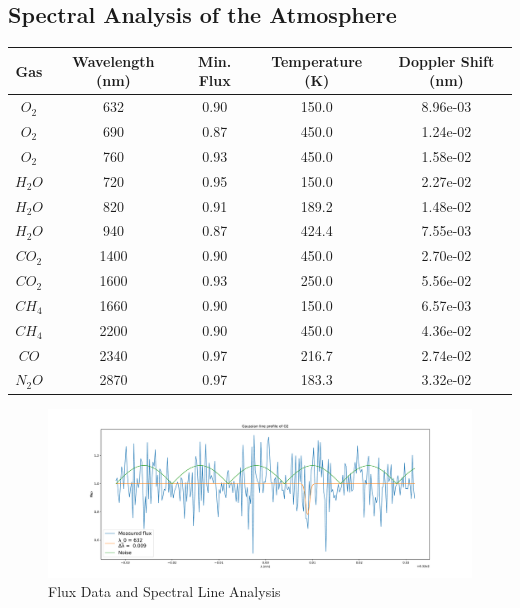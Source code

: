 \documentclass[reprint,english,notitlepage]{revtex4-2}
\begin{document}
\subsection{Spectral Analysis of the Atmosphere} \label{ssec: Analysis results}
\begin{table}[h!] \label{tab: Spec anal}
  \begin{tabular}{|c|*{4}{c|}}    
    \hline
    Gas  &Wavelength (nm) &Min. Flux &Temperature (K) &Doppler Shift (nm) \\
    \hline
    $ O_{2} $ &632 &0.90 &150.0 &8.96e-03 \\
    \hline
    $ O_{2} $ &690 &0.87 &450.0 &1.24e-02 \\
    \hline
    $ O_{2} $ &760 &0.93 &450.0 &1.58e-02 \\
    \hline
    $ H_{2}O $ &720 &0.95 &150.0 &2.27e-02 \\
    \hline
    $ H_{2}O $ &820 &0.91 &189.2 &1.48e-02 \\
    \hline
    $ H_{2} O$ &940 &0.87 &424.4 &7.55e-03 \\
    \hline
    $ CO_{2} $ &1400 &0.90 &450.0 &2.70e-02 \\
    \hline
    $ CO_{2} $ &1600 &0.93 &250.0 &5.56e-02 \\
    \hline
    $ CH_{4} $ &1660 &0.90 &150.0 &6.57e-03 \\
    \hline
    $ CH_{4} $ &2200 &0.90 &450.0 &4.36e-02 \\
    \hline
    $ CO $ &2340 &0.97 &216.7 &2.74e-02 \\
    \hline
    $ N_{2}O $ &2870 &0.97 &183.3 &3.32e-02 \\
    \hline
    \end{tabular}
  \end{table}
  \newpage
  \clearpage
  \begin{figure}[h!]  
    \centering
    \includegraphics[scale =.3]{Figures/O2 632.pdf}
    \caption{Flux Data and Spectral Line Analysis}
    \label{fig: O2 632}
\end{figure}
\end{document}

